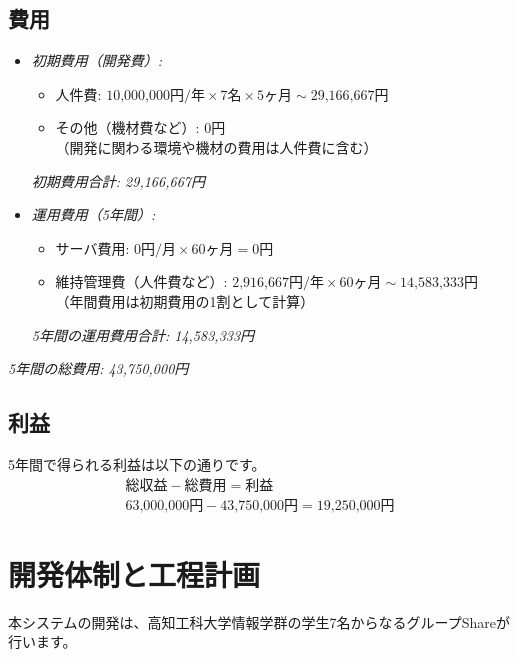 \documentclass{docs}
\begin{document}
\subsection{費用}
\begin{itemize}
	\item \emph{初期費用（開発費）:}
		\begin{itemize}
			\item 人件費: $\text{10,000,000円/年}\times\text{7名}\times\text{5ヶ月}
			\sim\text{29,166,667円}$
			\item その他（機材費など）: 0円\\
			（開発に関わる環境や機材の費用は人件費に含む）
		\end{itemize}
		\emph{初期費用合計: 29,166,667円}
	\item \emph{運用費用（5年間）:}
		\begin{itemize}
			\item サーバ費用: $\text{0円/月}\times\text{60ヶ月}
			=\text{0円}$
			\item 維持管理費（人件費など）: $\text{2,916,667円/年}\times\text{60ヶ月}
			\sim\text{14,583,333円}$\\
			（年間費用は初期費用の1割として計算）
		\end{itemize}
		\emph{5年間の運用費用合計: 14,583,333円}
\end{itemize}
\emph{5年間の総費用: 43,750,000円}

\subsection{利益}
5年間で得られる利益は以下の通りです。
\begin{gather*}
	\text{総収益} - \text{総費用} = \text{利益}\\
	\text{63,000,000円} - \text{43,750,000円} = \text{19,250,000円}
\end{gather*}

\section{開発体制と工程計画}

本システムの開発は、高知工科大学情報学群の学生7名からなるグループShareが
行います。
\end{document}
